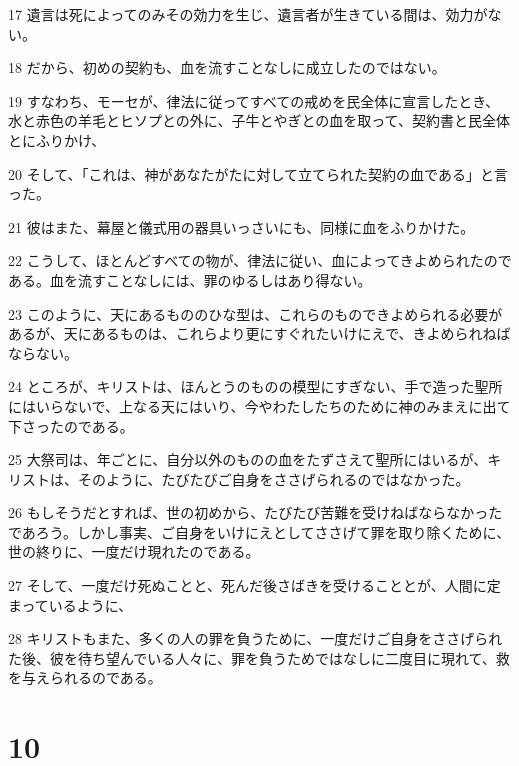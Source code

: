 \par 17 遺言は死によってのみその効力を生じ、遺言者が生きている間は、効力がない。
\par 18 だから、初めの契約も、血を流すことなしに成立したのではない。
\par 19 すなわち、モーセが、律法に従ってすべての戒めを民全体に宣言したとき、水と赤色の羊毛とヒソプとの外に、子牛とやぎとの血を取って、契約書と民全体とにふりかけ、
\par 20 そして、「これは、神があなたがたに対して立てられた契約の血である」と言った。
\par 21 彼はまた、幕屋と儀式用の器具いっさいにも、同様に血をふりかけた。
\par 22 こうして、ほとんどすべての物が、律法に従い、血によってきよめられたのである。血を流すことなしには、罪のゆるしはあり得ない。
\par 23 このように、天にあるもののひな型は、これらのものできよめられる必要があるが、天にあるものは、これらより更にすぐれたいけにえで、きよめられねばならない。
\par 24 ところが、キリストは、ほんとうのものの模型にすぎない、手で造った聖所にはいらないで、上なる天にはいり、今やわたしたちのために神のみまえに出て下さったのである。
\par 25 大祭司は、年ごとに、自分以外のものの血をたずさえて聖所にはいるが、キリストは、そのように、たびたびご自身をささげられるのではなかった。
\par 26 もしそうだとすれば、世の初めから、たびたび苦難を受けねばならなかったであろう。しかし事実、ご自身をいけにえとしてささげて罪を取り除くために、世の終りに、一度だけ現れたのである。
\par 27 そして、一度だけ死ぬことと、死んだ後さばきを受けることとが、人間に定まっているように、
\par 28 キリストもまた、多くの人の罪を負うために、一度だけご自身をささげられた後、彼を待ち望んでいる人々に、罪を負うためではなしに二度目に現れて、救を与えられるのである。

\chapter{10}

